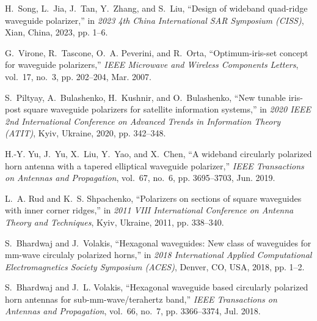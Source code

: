 \documentclass[journal]{IEEEtran}
\begin{document}
\begin{thebibliography}{1}
    H.~Song, L.~Jia, J.~Tan, Y.~Zhang, and S.~Liu, ``Design of wideband quad-ridge waveguide polarizer,'' in \emph{2023 4th China International SAR Symposium (CISS)}, Xian, China, 2023, pp. 1--6.
    
    G.~Virone, R.~Tascone, O.~A. Peverini, and R.~Orta, ``Optimum-iris-set concept for waveguide polarizers,'' \emph{IEEE Microwave and Wireless Components Letters}, vol.~17, no.~3, pp. 202--204, Mar. 2007.
    
    S.~Piltyay, A.~Bulashenko, H.~Kushnir, and O.~Bulashenko, ``New tunable iris-post square waveguide polarizers for satellite information systems,'' in \emph{2020 IEEE 2nd International Conference on Advanced Trends in Information Theory (ATIT)}, Kyiv, Ukraine, 2020, pp. 342--348.
    
    H.-Y. Yu, J.~Yu, X.~Liu, Y.~Yao, and X.~Chen, ``A wideband circularly polarized horn antenna with a tapered elliptical waveguide polarizer,'' \emph{IEEE Transactions on Antennas and Propagation}, vol.~67, no.~6, pp. 3695--3703, Jun. 2019.
    
    L.~A. Rud and K.~S. Shpachenko, ``Polarizers on sections of square waveguides with inner corner ridges,'' in \emph{2011 VIII International Conference on Antenna Theory and Techniques}, Kyiv, Ukraine, 2011, pp. 338--340.
    
    S.~Bhardwaj and J.~Volakis, ``Hexagonal waveguides: New class of waveguides for mm-wave circulaly polarized horns,'' in \emph{2018 International Applied Computational Electromagnetics Society Symposium (ACES)}, Denver, CO, USA, 2018, pp. 1--2.
    
    S.~Bhardwaj and J.~L. Volakis, ``Hexagonal waveguide based circularly polarized horn antennas for sub-mm-wave/terahertz band,'' \emph{IEEE Transactions on Antennas and Propagation}, vol.~66, no.~7, pp. 3366--3374, Jul. 2018.
    

\end{thebibliography}
\end{document}
